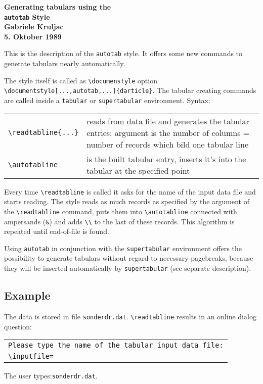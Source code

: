  
\textheight 24cm
\textwidth 17cm
\topmargin -2cm
\oddsidemargin -1cm
\parskip 6pt
 

\begin{center}
\Large\bf Generating tabulars using the \\
          {\tt autotab} Style           \\[.5cm]
\normalsize Gabriele Kruljac \\
            5. Oktober 1989
\end{center}
This is the description of the {\tt autotab} style. It offers some
new commands to generate tabulars nearly automatically.
 
The style itself is called as \verb|\documenstyle| option
\verb|\documentstyle[...,autotab,...]{darticle}|. The tabular
creating commands are called inside a {\tt tabular} or
{\tt supertabular} environment. Syntax:
\begin{center}
\begin{tabular}{l p{10cm}}
\verb|\readtabline{...}| & reads from data file and generates
                          the tabular entries; argument is
                          the number of columns = number of records
                          which bild one tabular line \\
\verb|\autotabline|      & is the built tabular entry, inserts it's
                           into the tabular  at the specified point
\end{tabular}
\end{center}
 
Every time \verb|\readtabline| is called it asks for the name of
the input data file and starts reading. The style reads as much records
as specified by the argument of the \verb|\readtabline| command,
puts them into \verb|\autotabline| connected with ampersands (\verb|&|)
and adds \verb|\\| to the last of these records.
This algorithm is repeated until end-of-file is found.
 
Using {\tt autotab} in conjunction with the {\tt supertabular}
environment offers the possibility to generate tabulars without regard
to necessary pagebreaks, because they will be inserted automatically
by {\tt supertabular} (see separate description).
 
\subsection*{Example}
The data is stored in file {\tt sonderdr.dat}. \verb|\readtabline|
results in an online dialog question:
\begin{center}
\begin{tabular}{l}
\tt Please type the name of the tabular input data file:\\
\verb|\inputfile=|
\end{tabular}
\end{center}
The user types:\hfill{\tt sonderdr.dat}.\hspace*{\fill}
 
